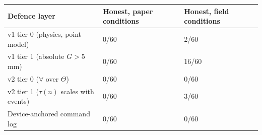 
\begin{tabular}{@{}p{4.20cm}p{2.10cm}p{2.10cm}@{}}
\toprule
Defence layer & Honest, paper conditions & Honest, field conditions \\
\midrule
v1 tier 0 (physics, point model) & 0/60 & 2/60 \\
v1 tier 1 (absolute $G>5$\,mm) & 0/60 & 16/60 \\
v2 tier 0 ($\forall$ over $\Theta$) & 0/60 & 0/60 \\
v2 tier 1 ($\tau(n)$ scales with events) & 0/60 & 3/60 \\
Device-anchored command log & 0/60 & 0/60 \\
\bottomrule
\end{tabular}

